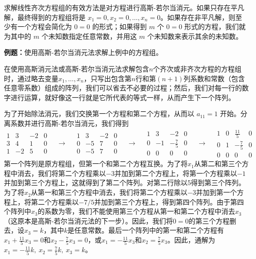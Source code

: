     求解线性齐次方程组的有效方法是对方程进行高斯-若尔当消元。如果只存在平凡解，最终得到的方程组将是 $x_1=0,x_2=0,\ldots,x_n=0$。如果存在非平凡解，则至少有一个方程会简化为 $0=0$ 的形式；如果得到 $m$ 个 $0=0$ 形式的方程，我们就为其中的 $m$ 个未知数指定任意常数，并用这 $m$ 个未知数来表示其余的未知数。

    \begin{examplebox}
        \textbf{例题：}使用高斯-若尔当消元法求解上例中的方程组。

        在使用高斯消元法或高斯-若尔当消元法求解包含$n$个齐次或非齐次方程的方程组时，通过略去变量$x_1,\ldots,x_n$，只写出包含第$n$行和第$\left(n+1\right)$列系数和常数（包含任意零系数）组成的阵列，我们可以省去不必要的过程；然后，我们对每一行的数字进行运算，就好像这一行就是它所代表的等式一样，从而产生下一个阵列。

        为了开始除法消元，我们交换第一个方程和第二个方程，从而以 $a_{11} = 1$ 开始。分离系数并进行高斯-若尔当消元，我们得到
        \begin{equation*}
            \begin{matrix}
                1 & 3 & -2 & 0 \\
                3 & 4 & 1 & 0 \\
                1 & -2 & 5 & 0
            \end{matrix} \quad \rightarrow \quad 
            \begin{matrix}
                1 & 3 & -2 & 0 \\
                0 & -5 & 7 & 0 \\
                0 & -5 & 7 & 0
            \end{matrix} \quad \rightarrow \quad 
            \begin{matrix}
                1 & 3 & -2 & 0 \\
                0 & -1 & -\frac{7}{5} & 0 \\
                0 & 0 & 0 & 0
            \end{matrix} \quad \rightarrow \quad
            \begin{matrix}
                1 & 0 & \frac{11}{5} & 0 \\
                0 & 1 & -\frac{7}{5} & 0 \\
                0 & 0 & 0 & 0
            \end{matrix}
        \end{equation*}
        第一个阵列是原方程组，但第一个和第二个方程互换。为了将$x_1$从第二和第三个方程中消去，我们将第二个方程乘以$-3$并加到第二个方程上，将第一个方程乘以$-1$并加到第三个方程上，这就得到了第二个阵列。对第二行除以5得到第三个阵列。为了将$x_2$从第一和第三个方程中消去，我们将第二个方程乘以$-3$并加到第一个方程上，将第二个方程乘以$-7/5$并加到第三个方程上，得到第四个阵列。由于第四个阵列中$x_3$的系数为零，我们不能使用第三个方程从第一和第二个方程中消去$x_3$（这原本是高斯-若尔当消元法的下一步）。因此，我们将$0=0$的第三个方程删去，设$x_3=k$，其中$k$是任意常数。最后一个阵列中的第一和第二个方程有$x_1 + \frac{11}{5}x_3 = 0$和$x_2 - \frac{7}{5}x_3 = 0$，或$x_1 = -\frac{11}{5}x_3$和$x_2 = \frac{7}{5}x_3$。因此，通解为$x_1 = -\frac{11}{5}k, \: x_2 = \frac{7}{5}k, \: x_3 = k$。
    \end{examplebox}

